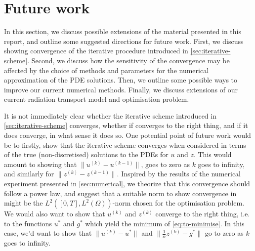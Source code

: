 \section{Future work}

In this section, we discuss possible extensions of the material presented in this report, and outline some suggested directions for future work. First, we discuss showing convergence of the iterative procedure introduced in \autoref{sec:iterative-scheme}. Second, we discuss how the sensitivity of the convergence may be affected by the choice of methods and parameters for the numerical approximation of the PDE solutions. Then, we outline some possible ways to improve our current numerical methods. Finally, we discuss extensions of our current radiation transport model and optimisation problem.

It is not immediately clear whether the iterative scheme introduced in \autoref{sec:iterative-scheme} converges, whether if converges to the right thing, and if it does converge, in what sense it does so. One potential point of future work would be to firstly, show that the iterative scheme converges when considered in terms of the true (non-discretised) solutions to the PDEs for $u$ and $z$. This would amount to showing that $\lVert u^{(k)} - u^{(k-1)} \rVert$, goes to zero as $k$ goes to infinity, and similarly for $\lVert z^{(k)} - z^{(k-1)} \rVert$. Inspired by the results of the numerical experiment presented in \autoref{sec:numerical}, we theorize that this convergence should follow a power law, and suggest that a suitable norm to show convergence in might be the $L^2([0,T],L^2(\Omega))$-norm chosen for the optimisation problem. We would also want to show that $u^{(k)}$ and $z^{(k)}$ converge to the right thing, i.e. to the functions $u^{*}$ and $g^{*}$ which yield the minimum of \autoref{eq:to-minimise}. In this case, we'd want to show that $\lVert u^{(k)} - u^{*} \rVert$ and $\lVert \frac{1}{\alpha}z^{(k)} - g^{*} \rVert$ go to zero as $k$ goes to infinity.

